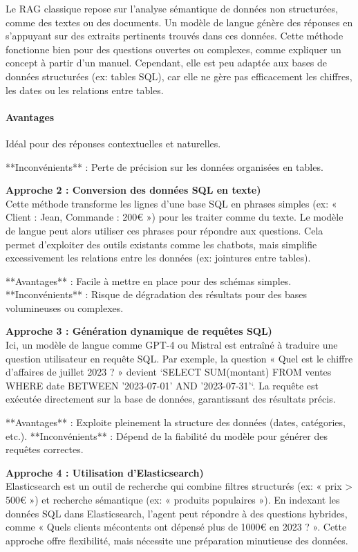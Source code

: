\documentclass[a4paper,11pt]{article}
\begin{document}
Le RAG classique repose sur l’analyse sémantique de données non structurées, comme des textes ou des documents. Un modèle de langue génère des réponses en s’appuyant sur des extraits pertinents trouvés dans ces données. Cette méthode fonctionne bien pour des questions ouvertes ou complexes, comme expliquer un concept à partir d’un manuel. Cependant, elle est peu adaptée aux bases de données structurées (ex: tables SQL), car elle ne gère pas efficacement les chiffres, les dates ou les relations entre tables.  

\paragraph{Avantages} \mbox{} %
Idéal pour des réponses contextuelles et naturelles.  

**Inconvénients** : Perte de précision sur les données organisées en tables.  


\textbf{Approche 2 : Conversion des données SQL en texte)} \\   
Cette méthode transforme les lignes d’une base SQL en phrases simples (ex: « Client : Jean, Commande : 200€ ») pour les traiter comme du texte. Le modèle de langue peut alors utiliser ces phrases pour répondre aux questions. Cela permet d’exploiter des outils existants comme les chatbots, mais simplifie excessivement les relations entre les données (ex: jointures entre tables).  

**Avantages** : Facile à mettre en place pour des schémas simples.  
**Inconvénients** : Risque de dégradation des résultats pour des bases volumineuses ou complexes.  


\textbf{Approche 3 : Génération dynamique de requêtes SQL)} \\  
Ici, un modèle de langue comme GPT-4 ou Mistral est entraîné à traduire une question utilisateur en requête SQL. Par exemple, la question « Quel est le chiffre d’affaires de juillet 2023 ? » devient `SELECT SUM(montant) FROM ventes WHERE date BETWEEN '2023-07-01' AND '2023-07-31'`. La requête est exécutée directement sur la base de données, garantissant des résultats précis.  

**Avantages** : Exploite pleinement la structure des données (dates, catégories, etc.).  
**Inconvénients** : Dépend de la fiabilité du modèle pour générer des requêtes correctes.  


\textbf{Approche 4 : Utilisation d’Elasticsearch)} \\  
Elasticsearch est un outil de recherche qui combine filtres structurés (ex: « prix > 500€ ») et recherche sémantique (ex: « produits populaires »). En indexant les données SQL dans Elasticsearch, l’agent peut répondre à des questions hybrides, comme « Quels clients mécontents ont dépensé plus de 1000€ en 2023 ? ». Cette approche offre flexibilité, mais nécessite une préparation minutieuse des données.  
\end{document}
